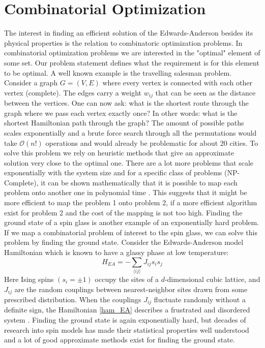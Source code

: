 \section{Combinatorial Optimization}
The interest in finding an efficient solution of the Edwards-Anderson besides its physical properties is the relation to combinatoric optimization problems. In combinatorial optimization problems we are interested in the "optimal" element of some set. Our problem statement defines what the requirement is for this element to be optimal. A well known example is the travelling salesman problem. Consider a graph $G = (V,E)$ where every vertex is connected with each other vertex (complete). The edges carry a weight $w_{ij}$ that can be seen as the distance between the vertices. One can now ask: what is the shortest route through the graph where we pass each vertex exactly once? In other words: what is the shortest Hamiltonian path through the graph? The amount of possible paths scales exponentially and a brute force search through all the permutations would take $\mathcal{O}(n!)$ operations and would already be problematic for about 20 cities. To solve this problem we rely on heuristic methods that give an approximate solution very close to the optimal one. There are a lot more problems that scale exponentially with the system size and for a specific class of problems (NP-Complete), it can be shown mathematically that it is possible to map each problem onto another one in polynomial time \cite{Lucas2014}. This suggests that it might be more efficient to map the problem 1 onto problem 2, if a more efficient algorithm exist for problem 2 and the cost of the mapping is not too high. Finding the ground state of a spin glass is another example of an exponentially hard problem. If we map a combinatorial problem of interest to the spin glass, we can solve this problem by finding the ground state. Consider the Edwards-Anderson model Hamiltonian which is known to have a glassy phase at low temperature:
\begin{equation}
    H_{EA} = -\sum_{\langle ij \rangle} J_{ij} s_i s_j
    \label{ham_EA}
\end{equation}
Here Ising spins $(s_i=\pm 1)$ occupy the sites of a $d$-dimensional cubic lattice, and $J_{ij}$ are the random couplings between nearest-neighbor sites drawn from some prescribed distribution. When the couplings $J_{ij}$ fluctuate randomly without a definite sign, the Hamiltonian \ref{ham_EA} describes a frustrated and disordered system \cite{Nishimori2001}. Finding the ground state is again exponentially hard, but decades of research into spin models has made their statistical properties well understood and a lot of good approximate methods exist for finding the ground state. \newline

